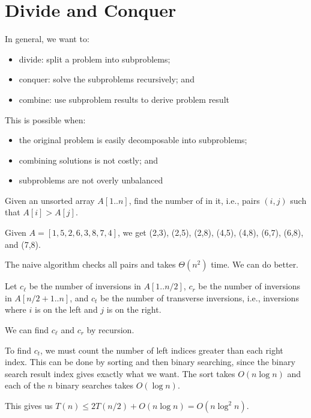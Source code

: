 \chapter{Divide and Conquer}
In general, we want to:
\begin{itemize}[nosep]
  \item divide: split a problem into subproblems;
  \item conquer: solve the subproblems recursively; and
  \item combine: use subproblem results to derive problem result
\end{itemize}
This is possible when:
\begin{itemize}[nosep]
  \item the original problem is easily decomposable into subproblems;
  \item combining solutions is not costly; and
  \item subproblems are not overly unbalanced
\end{itemize}
\begin{problem}
Given an unsorted array $A[1..n]$, find the number of  in it,
i.e., pairs $(i,j)$ such that $A[i] > A[j]$.
\end{problem}
\begin{example}
  Given $A = [1,5,2,6,3,8,7,4]$,
  we get (2,3), (2,5), (2,8), (4,5), (4,8), (6,7), (6,8), and (7,8).
\end{example}
The naive algorithm checks all pairs and takes $\Theta(n^2)$ time.
We can do better.

Let $c_\ell$ be the number of inversions in $A[1..n/2]$,
$c_r$ be the number of inversions in $A[n/2+1..n]$,
and $c_t$ be the number of transverse inversions, i.e.,
inversions where $i$ is on the left and $j$ is on the right.

We can find $c_\ell$ and $c_r$ by recursion.

To find $c_t$, we must count the number of left indices
greater than each right index.
This can be done by sorting and then binary searching,
since the binary search result index gives exactly what we want.
The sort takes $O(n\log n)$ and each of the $n$ binary searches takes $O(\log n)$.

This gives us $T(n) \leq 2T(n/2) + O(n\log n) = O(n\log^2 n)$.

